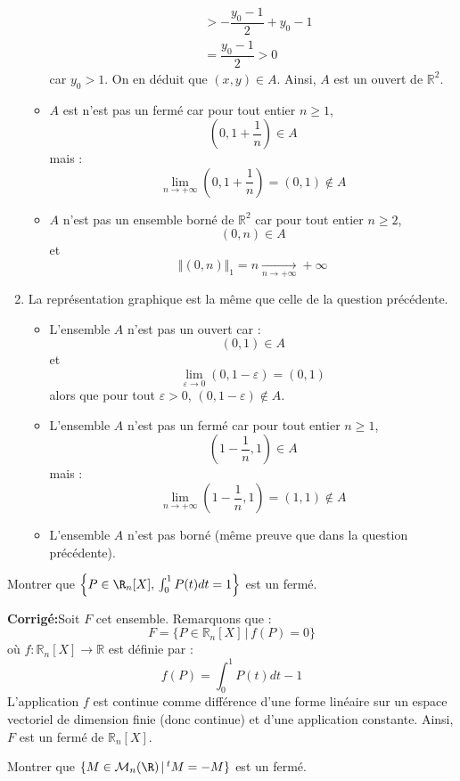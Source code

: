 \documentclass[a4paper,twoside,french,11pt]{VcCours}
\newcommand{\corr}{\textbf{Corrigé:}}
\begin{document}
\begin{enumerate}
\begin{itemize}
\begin{align*}
& > - \dfrac{y_0-1}{2} + y_0-1 \\
& = \dfrac{y_0-1}{2}>0
\end{align*}
car $y_0>1$. On en déduit que $(x,y) \in A$. Ainsi, $A$ est un ouvert de $\mathbb{R}^2$.
\item $A$ est n'est pas un fermé car pour tout entier $n \geq 1$,
$$ \left(0,1+ \dfrac{1}{n} \right) \in A$$
mais :
$$ \lim_{n \rightarrow + \infty} \left(0,1 + \dfrac{1}{n}\right) = (0,1) \notin A$$
\item $A$ n'est pas un ensemble borné de $\mathbb{R}^2$ car pour tout entier $n \geq 2$,
$$ (0,n) \in A$$
et 
$$ \Vert (0,n) \Vert_1 = n \underset{n \rightarrow + \infty}{\longrightarrow} + \infty$$
\end{itemize}
\item La représentation graphique est la même que celle de la question précédente. 
\begin{itemize}
\item L'ensemble $A$ n'est pas un ouvert car :
$$ (0,1) \in A$$
et 
$$ \lim_{\varepsilon \rightarrow 0} (0,1- \varepsilon) = (0,1)$$
alors que pour tout $\varepsilon>0$, $(0,1- \varepsilon) \notin A$. 
\item L'ensemble $A$ n'est pas un fermé car  pour tout entier $n \geq 1$,
$$ \left(1- \dfrac{1}{n},1\right) \in A$$
mais :
$$ \lim_{n \rightarrow + \infty} \left(1- \dfrac{1}{n},1\right) = (1,1) \notin A$$
\item L'ensemble $A$ n'est pas borné (même preuve que dans la question précédente).
\end{itemize}
\end{enumerate}

\begin{Exercice}{} Montrer que $\left\{P\in\R_n[X], \, \int_0^1P(t)dt= 1\right\}$ est un fermé.
\end{Exercice}

\corr Soit $F$ cet ensemble. Remarquons que :
$$ F = \lbrace P \in \mathbb{R}_n[X] \, \vert \, f(P)=0 \rbrace$$
où $f: \mathbb{R}_n[X] \rightarrow \mathbb{R}$ est définie par :
$$ f(P)= \int_0^1P(t)dt-1$$
L'application $f$ est continue comme différence d'une forme linéaire sur un espace vectoriel de dimension finie (donc continue) et d'une application constante. Ainsi, $F$ est un fermé de $\mathbb{R}_n[X]$.

\begin{Exercice}{} Montrer que $\{M\in{\cal M}_n(\R) \, \vert \,  ^tM=-M\}$ est un fermé.
\end{Exercice}
\end{document}
